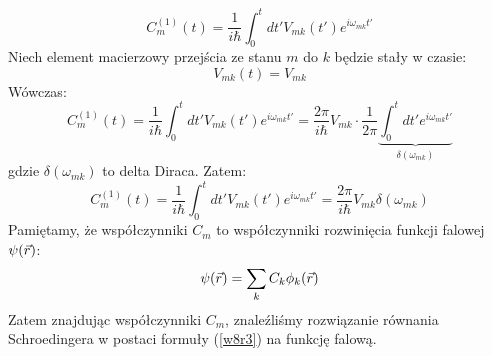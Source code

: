 \begin{equation}{C}_m^{(1)}(t)=\frac{1}{i\hbar}\int_0^t dt'V_{mk}(t')e^{i\omega_{mk}t'}
\end{equation}
Niech element macierzowy przejścia ze stanu $m$ do $k$ będzie stały w czasie:
\begin{equation} V_{mk}(t)=V_{mk}\end{equation}
Wówczas:
\begin{equation}{C}_m^{(1)}(t)=\frac{1}{i\hbar}\int_0^t dt'V_{mk}(t')e^{i\omega_{mk}t'}=\frac{2\pi}{i\hbar}V_{mk}\cdot \frac{1}{2\pi}\underbrace{\int_0^t dt' e^{i\omega_{mk}t'}}_{\delta(\omega_{mk})}
\end{equation}
gdzie ${\delta(\omega_{mk})}$ to delta Diraca. Zatem:
\begin{equation}
C_m^{(1)}(t)=\frac{1}{i\hbar}\int_0^t dt'V_{mk}(t')e^{i\omega_{mk}t'}=\frac{2\pi}{i\hbar}V_{mk}\delta(\omega_{mk})
\end{equation}
Pamiętamy, że współczynniki $C_m$ to współczynniki rozwinięcia funkcji falowej $\psi(\vec{r})$:
\begin{equation}\psi(\vec{r})=\sum_k C_k\phi_k(\vec{r}) \label{w8r3}
\end{equation}
Zatem znajdując współczynniki $C_m$, znaleźliśmy rozwiązanie równania Schroedingera w postaci formuły (\ref{w8r3}) na funkcję falową.
